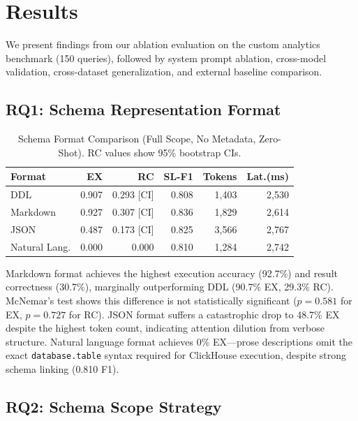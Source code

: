 \documentclass[sigconf, nonacm]{acmart}
\begin{document}
\section{Results}
\label{sec:results}

We present findings from our ablation evaluation on the custom analytics benchmark (150 queries), followed by system prompt ablation, cross-model validation, cross-dataset generalization, and external baseline comparison.

\subsection{RQ1: Schema Representation Format}

\begin{table}[t]
\caption{Schema Format Comparison (Full Scope, No Metadata, Zero-Shot). RC values show 95\% bootstrap CIs.}
\label{tab:format}
\centering
\small
\begin{tabular}{lrrrrr}
\toprule
\textbf{Format} & \textbf{EX} & \textbf{RC} & \textbf{SL-F1} & \textbf{Tokens} & \textbf{Lat.(ms)} \\
\midrule
DDL & 0.907 & 0.293 [CI] & 0.808 & 1,403 & 2,530 \\
Markdown & 0.927 & 0.307 [CI] & 0.836 & 1,829 & 2,614 \\
JSON & 0.487 & 0.173 [CI] & 0.825 & 3,566 & 2,767 \\
Natural Lang. & 0.000 & 0.000 & 0.810 & 1,284 & 2,742 \\
\bottomrule
\end{tabular}
\end{table}

Markdown format achieves the highest execution accuracy (92.7\%) and result correctness (30.7\%), marginally outperforming DDL (90.7\% EX, 29.3\% RC). McNemar's test shows this difference is not statistically significant ($p=0.581$ for EX, $p=0.727$ for RC). JSON format suffers a catastrophic drop to 48.7\% EX despite the highest token count, indicating attention dilution from verbose structure. Natural language format achieves 0\% EX---prose descriptions omit the exact \texttt{database.table} syntax required for ClickHouse execution, despite strong schema linking (0.810 F1).

\subsection{RQ2: Schema Scope Strategy}
\end{document}
